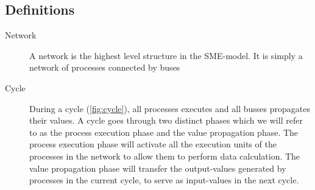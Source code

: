 

\subsection{Definitions}

\begin{description}
  \item[Network] A network is the highest level structure in the
    SME-model. It is simply a network of processes connected by buses
  \item[Cycle] During a cycle (\cref{fig:cycle}), all processes
    executes and all busses propagates their values. A cycle goes
    through two distinct phases which we will refer to as the process
    execution phase and the value propagation phase. The process
    execution phase will activate all the execution units of the
    processes in the network to allow them to perform data
    calculation. The value propagation phase will transfer the
    output-values generated by processes in the current cycle, to
    serve as input-values in the next cycle.
\end{description}
